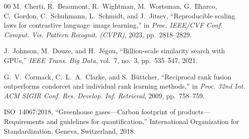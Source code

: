 \documentclass[conference]{IEEEtran}
\begin{document}
\begin{thebibliography}{00}
M.~Cherti, R.~Beaumont, R.~Wightman, M.~Wortsman, G.~Ilharco, C.~Gordon, C.~Schuhmann, L.~Schmidt, and J.~Jitsev, ``Reproducible scaling laws for contrastive language--image learning,'' in \textit{Proc. IEEE/CVF Conf. Comput. Vis. Pattern Recognit. (CVPR)}, 2023, pp.~2818--2829.

J.~Johnson, M.~Douze, and H.~J\'egou, ``Billion-scale similarity search with GPUs,'' \textit{IEEE Trans. Big Data}, vol.~7, no.~3, pp.~535--547, 2021.

G.~V.~Cormack, C.~L.~A.~Clarke, and S.~B\"uttcher, ``Reciprocal rank fusion outperforms condorcet and individual rank learning methods,'' in \textit{Proc. 32nd Int. ACM SIGIR Conf. Res. Develop. Inf. Retrieval}, 2009, pp.~758--759.

ISO~14067:2018, ``Greenhouse gases---Carbon footprint of products---Requirements and guidelines for quantification,'' International Organization for Standardization, Geneva, Switzerland, 2018.

\end{thebibliography}
\end{document}
